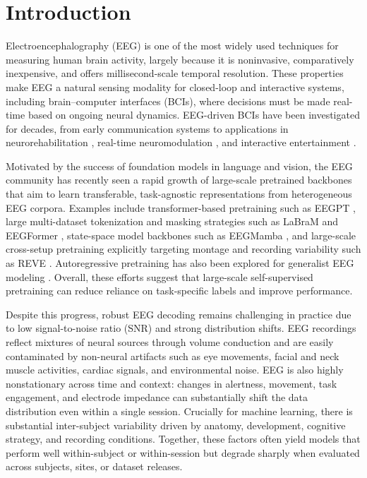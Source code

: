\documentclass[12pt]{article}
\begin{document}
\section{Introduction}
Electroencephalography (EEG) is one of the most widely used techniques for measuring human brain activity, largely because it is noninvasive, comparatively inexpensive, and offers millisecond-scale temporal resolution. These properties make EEG a natural sensing modality for closed-loop and interactive systems, including brain--computer interfaces (BCIs), where decisions must be made real-time based on ongoing neural dynamics.
EEG-driven BCIs have been investigated for decades, from early communication systems \citep{FarwellDonchin1988P300Speller}
to applications in neurorehabilitation \citep{Hamedi2016BCIRehabReview}, real-time neuromodulation
\citep{Zrenner2018EEGStateDependentTMS}, and interactive entertainment \citep{Lecuyer2008BCIVRVideogames}.

Motivated by the success of foundation models in language and vision, the EEG community has recently seen a rapid growth of large-scale pretrained backbones that aim to learn transferable, task-agnostic representations from heterogeneous EEG corpora. Examples include transformer-based pretraining such as EEGPT \citep{wang2024eegpt}, large multi-dataset tokenization and masking strategies such as LaBraM \citep{Jiang2024LaBraM} and EEGFormer \citep{Chen2024EEGFormer}, state-space model backbones such as EEGMamba \citep{Wang2025EEGMamba}, and large-scale cross-setup pretraining explicitly targeting montage and recording variability such as REVE \citep{ElOuahidi2025REVE}. Autoregressive pretraining has also been explored for generalist EEG modeling \citep{Yue2024BrainGPT}. Overall, these efforts suggest that large-scale self-supervised pretraining can reduce reliance on task-specific labels and improve performance.

Despite this progress, robust EEG decoding remains challenging in practice due to low signal-to-noise ratio (SNR) and strong distribution shifts. EEG recordings reflect mixtures of neural sources through volume conduction and are easily contaminated by non-neural artifacts such as eye movements, facial and neck muscle activities, cardiac signals, and environmental noise. EEG is also highly nonstationary across time and context: changes in alertness, movement, task engagement, and electrode impedance can substantially shift the data distribution even within a single session. Crucially for machine learning, there is substantial inter-subject variability driven by anatomy, development, cognitive strategy, and recording conditions. Together, these factors often yield models that perform well within-subject or within-session but degrade sharply when evaluated across subjects, sites, or dataset releases.
\end{document}
